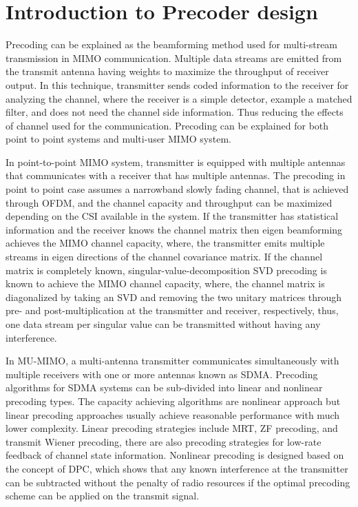 
\section{Introduction to Precoder design}

Precoding can be explained as the beamforming method used for multi-stream transmission in \ac{MIMO} communication. Multiple data streams are emitted from the transmit antenna having weights to maximize the throughput of receiver output. In this technique, transmitter sends coded information to the receiver for analyzing the channel, where the receiver is a simple detector, example a matched filter, and does not need the channel side information. Thus reducing the effects of channel used for the communication. Precoding can be explained for both point to point systems and multi-user \ac{MIMO} system.

In point-to-point \ac{MIMO} system, transmitter is equipped with multiple antennas that communicates with a receiver that has multiple antennas. The precoding in point to point case assumes a narrowband slowly fading channel, that is achieved through \ac{OFDM}, and the channel capacity and throughput can be maximized depending on the \ac{CSI} available in the system. If the transmitter has statistical information and the receiver knows the channel matrix then eigen beamforming achieves the \ac{MIMO} channel capacity, where, the transmitter emits multiple streams in eigen directions of the channel covariance matrix. If the channel matrix is completely known, singular-value-decomposition \ac{SVD} precoding is known to achieve the \ac{MIMO} channel capacity, where, the channel matrix is diagonalized by taking an \ac{SVD} and removing the two unitary matrices through pre- and post-multiplication at the transmitter and receiver, respectively, thus, one data stream per singular value can be transmitted without having any interference.

In \ac{MU}-\ac{MIMO}, a multi-antenna transmitter communicates simultaneously with multiple receivers with one or more antennas known as \ac{SDMA}. Precoding algorithms for \ac{SDMA} systems can be sub-divided into linear and nonlinear precoding types. The capacity achieving algorithms are nonlinear approach but linear precoding approaches usually achieve reasonable performance with much lower complexity. Linear precoding strategies include \ac{MRT},  \ac{ZF} precoding, and transmit Wiener precoding, there are also precoding strategies for low-rate feedback of channel state information. Nonlinear precoding is designed based on the concept of \ac{DPC}, which shows that any known interference at the transmitter can be subtracted without the penalty of radio resources if the optimal precoding scheme can be applied on the transmit signal.

